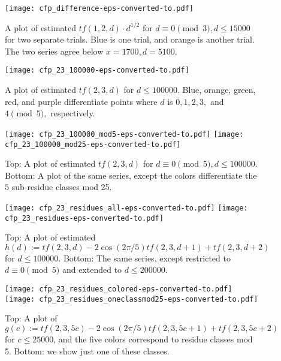 \documentclass[11pt]{amsart} %
\begin{document}
\begin{figure}[htbp]
	\centering
    \texttt{[image: cfp\_difference-eps-converted-to.pdf]}
    \caption{A plot of estimated $tf(1,2,d) \cdot d^{1/2}$ for $d \equiv 0 \pmod{3}, d \leq 15000$ for two separate trials.  Blue is one trial, and orange is another trial. The two series agree below $x = 1700, d = 5100$.}
    \label{fig:tf12d-est2}
\end{figure}

\begin{figure}[htbp]
	\centering
    \texttt{[image: cfp\_23\_100000-eps-converted-to.pdf]}
    \caption{A plot of estimated $tf(2,3,d)$ for $d \leq 100000.$ Blue, orange, green, red, and purple differentiate points where $d$ is $0, 1, 2, 3, $ and $4 \pmod{5},$ respectively.  %
    }
    \label{fig:tf23d-est}
\end{figure}

\begin{figure}[htbp]
\centering
    \texttt{[image: cfp\_23\_100000\_mod5-eps-converted-to.pdf]}
  \texttt{[image: cfp\_23\_100000\_mod25-eps-converted-to.pdf]}
    \caption{Top: A plot of estimated $tf(2,3,d)$ for $d \equiv 0 \pmod{5}, d \leq 100000$. Bottom: A plot of the same series, except the colors differentiate the $5$ sub-residue classes $\text{mod}$ 25.
    }
    \label{fig:tf23d-est2}
\end{figure}

\begin{figure}[htbp]
\centering
\texttt{[image: cfp\_23\_residues\_all-eps-converted-to.pdf]}
\texttt{[image: cfp\_23\_residues-eps-converted-to.pdf]}
\caption{Top: A plot of estimated $h(d) := tf(2,3,d) -  2 \cos(2 \pi / 5) tf(2,3,d+1) + tf(2, 3, d+2)$ for $d \leq 100000.$ Bottom: The same series, except restricted to $d \equiv 0 \pmod{5}$ and extended to $d \leq 200000.$
}
\label{fig:tf23d-res1}
\end{figure}

\begin{figure}[htbp]
\centering
\texttt{[image: cfp\_23\_residues\_colored-eps-converted-to.pdf]}
\texttt{[image: cfp\_23\_residues\_oneclassmod25-eps-converted-to.pdf]}
\caption{Top: A plot of $g(c) := tf(2, 3, 5c) - 2 \cos(2 \pi / 5) tf(2,3,5c+1) + tf(2, 3, 5c+2)$ for $c \leq 25000$, and the five colors correspond to residue classes $\text{mod}$ 5. Bottom: we show just one of these classes.
}
\label{fig:tf23d-res2}
\end{figure}
\end{document}
